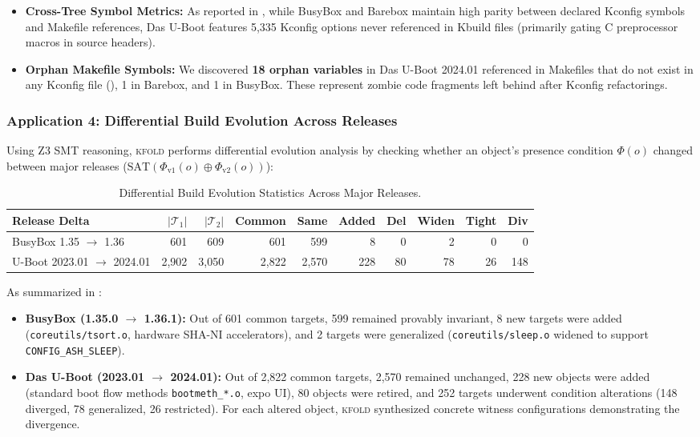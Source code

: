 \documentclass[acmsmall,screen,review]{acmart}
\newcommand{\tool}{\textsc{kfold}\xspace}
\begin{document}
\begin{itemize}
\item \textbf{Cross-Tree Symbol Metrics:} As reported in , while BusyBox and Barebox maintain high parity between declared Kconfig symbols and Makefile references, Das U-Boot features 5,335 Kconfig options never referenced in Kbuild files (primarily gating C preprocessor macros in source headers).
\item \textbf{Orphan Makefile Symbols:} We discovered \textbf{18 orphan variables} in Das U-Boot 2024.01 referenced in Makefiles that do not exist in any Kconfig file (), 1 in Barebox, and 1 in BusyBox. These represent zombie code fragments left behind after Kconfig refactorings.
\end{itemize}

\subsubsection{Application 4: Differential Build Evolution Across Releases}
Using Z3 SMT reasoning, \tool performs differential evolution analysis by checking whether an object's presence condition $\Phi(o)$ changed between major releases ($\text{SAT}(\Phi_{\text{v1}}(o) \oplus \Phi_{\text{v2}}(o))$):

\begin{table}[t]
\centering
\footnotesize
\setlength{\tabcolsep}{3.5pt}
\caption{Differential Build Evolution Statistics Across Major Releases.}
\label{tab:evolution}
\begin{tabular}{lrrrrrrrrr}
\toprule
\textbf{Release Delta} & $|\mathcal{T}_1|$ & $|\mathcal{T}_2|$ & \textbf{Common} & \textbf{Same} & \textbf{Added} & \textbf{Del} & \textbf{Widen} & \textbf{Tight} & \textbf{Div} \\
\midrule
BusyBox 1.35 $\to$ 1.36 & 601 & 609 & 601 & 599 & 8 & 0 & 2 & 0 & 0 \\
U-Boot 2023.01 $\to$ 2024.01 & 2,902 & 3,050 & 2,822 & 2,570 & 228 & 80 & 78 & 26 & 148 \\
\bottomrule
\end{tabular}
\end{table}

As summarized in :
\begin{itemize}
\item \textbf{BusyBox (1.35.0 $\to$ 1.36.1):} Out of 601 common targets, 599 remained provably invariant, 8 new targets were added (\texttt{coreutils/tsort.o}, hardware SHA-NI accelerators), and 2 targets were generalized (\texttt{coreutils/sleep.o} widened to support \texttt{CONFIG\_ASH\_SLEEP}).
\item \textbf{Das U-Boot (2023.01 $\to$ 2024.01):} Out of 2,822 common targets, 2,570 remained unchanged, 228 new objects were added (standard boot flow methods \texttt{bootmeth\_*.o}, expo UI), 80 objects were retired, and 252 targets underwent condition alterations (148 diverged, 78 generalized, 26 restricted). For each altered object, \tool synthesized concrete witness configurations demonstrating the divergence.
\end{itemize}
\end{document}
